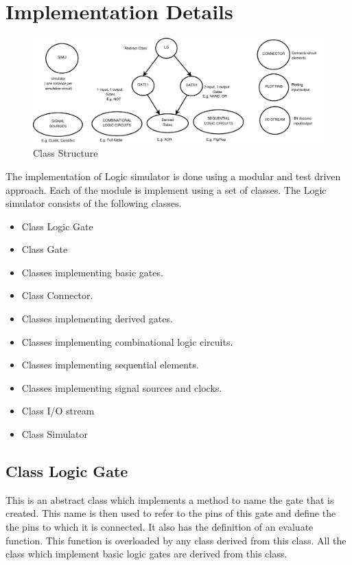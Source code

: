 \documentclass[a4paper,12pt]{article}
\begin{document}
\section{Implementation Details}

  \begin{figure}[h]
   \begin{center}
   \includegraphics[scale=0.3]{class3.png}
    \caption{{Class Structure}}
  \label{class_struct}
  \end{center}
  \end{figure}

The implementation of Logic simulator is done using a modular and test driven approach. Each of the module is implement using a 
set of classes. The Logic simulator consists of the following classes.
\begin{itemize}
\item Class Logic Gate
\item Class Gate
\item Classes implementing basic gates.
\item Class Connector.
\item Classes implementing derived gates.
\item Classes implementing combinational logic circuits.
\item Classes implementing sequential elements.
\item Classes implementing signal sources and clocks.
\item Class I/O stream 
\item Class Simulator
\end{itemize}

\subsection{Class Logic Gate}
This is an abstract class which implements a method to name the gate that is created. 
This name is then used to refer to the pins of this gate and define the the pins to which it is connected. It also has the definition of an evaluate function. This function is overloaded by any class derived from this class. All the class which implement basic logic gates are derived from this class.\\
\end{document}
